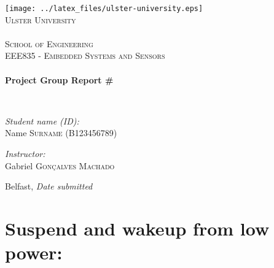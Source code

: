\documentclass[12pt,a4paper]{article}
\begin{document}
\begin{titlepage}
\begin{center}

\texttt{[image: ../latex\_files/ulster-university.eps]}~\\[1cm]

\textsc{\LARGE Ulster University \\ \ \\ School of Engineering}\\[1.5cm]

\textsc{\Large EEE835 - Embedded Systems and Sensors}\\[0.5cm]

\HRule \\[0.4cm]
{ \huge \bfseries Project Group Report \#\\[0.4cm] }

\HRule \\[1.5cm]
\end{center}
\begin{minipage}{0.4\textwidth}
\begin{flushleft} \large
\emph{Student name (ID):}\\
Name \textsc{Surname} (B123456789) \\
\end{flushleft}
\end{minipage}
\begin{minipage}[b]{0.4\textwidth}
\begin{flushright} \large
\emph{Instructor:} \\
Gabriel  \textsc{Gon\c{c}alves Machado}
\end{flushright}
\end{minipage}

\vfill

\begin{center}
{\large Belfast, \textit{Date submitted}}
\end{center}

\end{titlepage}

\clearpage
\section{ Suspend and wakeup from low power: }
\end{document}
